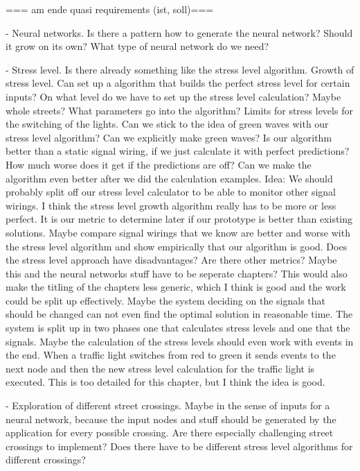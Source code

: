 === am ende quasi requirements (ist, soll)===

- Neural networks. Is there a pattern how to  generate the neural network? Should it grow on its own? What type of neural network do we need?

- Stress level. Is there already something like the stress level algorithm. Growth of stress level. Can set up a algorithm that builds the perfect stress level for certain inputs? On what level do we have to set up the stress level calculation? Maybe whole streets? What parameters go into the algorithm? Limits for stress levels for the switching of the lights. Can we stick to the idea of green waves with our stress level algorithm? Can we explicitly make green waves? Is our algorithm better than a static signal wiring, if we just calculate it with perfect predictions? How much worse does it get if the predictions are off? Can we make the algorithm even better after we did the calculation examples. Idea: We should probably split off our stress level calculator to be able to monitor other signal wirings. I think the stress level growth algorithm really has to be more or less perfect. It is our metric to determine later if our prototype is better than existing solutions. Maybe compare signal wirings that we know are better and worse with the stress level algorithm and show empirically that our algorithm is good. Does the stress level approach have disadvantages? Are there other metrics? Maybe this and the neural networks stuff have to be seperate chapters? This would also make the titling of the chapters less generic, which I think is good and the work could be split up effectively. Maybe the system deciding on the signals that should be changed can not even find the optimal solution in reasonable time. The system is split up in two phases one that calculates stress levels and one that the signals. Maybe the calculation of the stress levels should even work with events in the end. When a traffic light switches from red to green it sends events to the next node and then the new stress level calculation for the traffic light is executed. This is too detailed for this chapter, but I think the idea is good.

- Exploration of different street crossings. Maybe in the sense of inputs for a neural network, because the input nodes and stuff should be generated by the application for every possible crossing. Are there especially challenging street crossings to implement? Does there have to be different stress level algorithms for different crossings?

